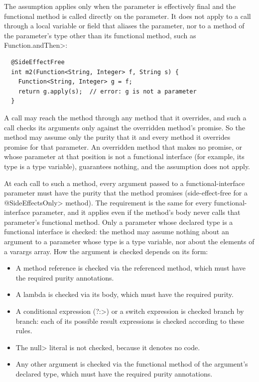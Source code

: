 The assumption applies only when the parameter is effectively final and the
functional method is called directly on the parameter.  It does not apply to a
call through a local variable or field that aliases the parameter, nor to a
method of the parameter's type other than its functional method, such as
\<Function.andThen>:

\begin{Verbatim}
  @SideEffectFree
  int m2(Function<String, Integer> f, String s) {
    Function<String, Integer> g = f;
    return g.apply(s);  // error: g is not a parameter
  }
\end{Verbatim}

A call may reach the method through any method that it overrides, and such a
call checks its arguments only against the overridden method's promise.  So
the method may assume only the purity that it and every method it overrides
promise for that parameter.  An overridden method that makes no promise, or
whose parameter at that position is not a functional interface (for example,
its type is a type variable), guarantees nothing, and the assumption does not
apply.

At each call to such a method, every argument passed to a functional-interface
parameter must have the purity that the method promises (side-effect-free for
a \<@SideEffectsOnly> method).  The requirement is the same for every
functional-interface parameter, and it applies even if the method's body never
calls that parameter's functional method.  Only a parameter whose declared
type is a functional interface is checked:  the method may assume nothing about an
argument to a parameter whose type is a type variable, nor about the elements
of a varargs array.  How the argument is checked depends on its form:

\begin{itemize}
\item
  A method reference is checked via the referenced method, which must have
  the required purity annotations.
\item
  A lambda is checked via its body, which must have the required purity.
\item
  A conditional expression (\<?:>) or a switch expression is checked branch
  by branch:  each of its possible result expressions is checked according
  to these rules.
\item
  The \<null> literal is not checked, because it denotes no code.
\item
  Any other argument is checked via the functional method of the argument's
  declared type, which must have the required purity annotations.
\end{itemize}

